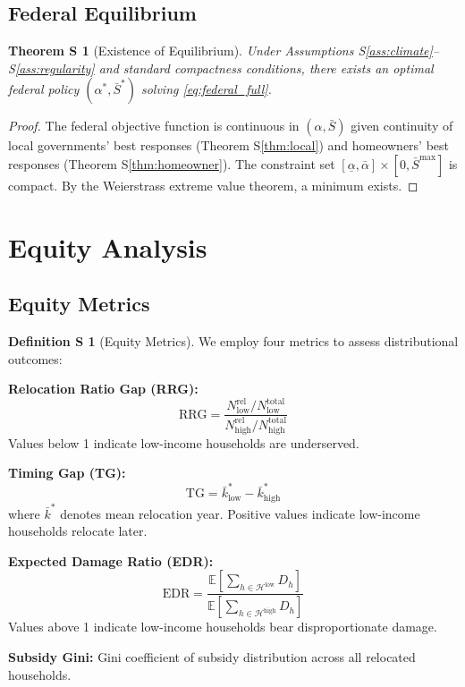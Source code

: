 \documentclass[11pt,letterpaper]{article}
\newtheorem{theoremS}{Theorem S}
\theoremstyle{definition}
\newtheorem{definitionS}{Definition S}
\newcommand{\E}{\mathbb{E}}
\begin{document}
\subsection{Federal Equilibrium}

\begin{theoremS}[Existence of Equilibrium]\label{thm:existence}
Under Assumptions S\ref{ass:climate}--S\ref{ass:regularity} and standard compactness conditions, there exists an optimal federal policy $(\alpha^*, \bar{S}^*)$ solving \eqref{eq:federal_full}.
\end{theoremS}

\begin{proof}
The federal objective function is continuous in $(\alpha, \bar{S})$ given continuity of local governments' best responses (Theorem S\ref{thm:local}) and homeowners' best responses (Theorem S\ref{thm:homeowner}). The constraint set $[\underline{\alpha}, \bar{\alpha}] \times [0, \bar{S}^{\max}]$ is compact. By the Weierstrass extreme value theorem, a minimum exists.
\end{proof}

\section{Equity Analysis}

\subsection{Equity Metrics}

\begin{definitionS}[Equity Metrics]
We employ four metrics to assess distributional outcomes:

\textbf{Relocation Ratio Gap (RRG):}
\begin{equation}
\text{RRG} = \frac{N_{\text{low}}^{\text{rel}} / N_{\text{low}}^{\text{total}}}{N_{\text{high}}^{\text{rel}} / N_{\text{high}}^{\text{total}}}
\end{equation}
Values below 1 indicate low-income households are underserved.

\textbf{Timing Gap (TG):}
\begin{equation}
\text{TG} = \bar{k}_{\text{low}}^* - \bar{k}_{\text{high}}^*
\end{equation}
where $\bar{k}^*$ denotes mean relocation year. Positive values indicate low-income households relocate later.

\textbf{Expected Damage Ratio (EDR):}
\begin{equation}
\text{EDR} = \frac{\E[\sum_{h \in \mathcal{H}^{\text{low}}} D_h]}{\E[\sum_{h \in \mathcal{H}^{\text{high}}} D_h]}
\end{equation}
Values above 1 indicate low-income households bear disproportionate damage.

\textbf{Subsidy Gini:} Gini coefficient of subsidy distribution across all relocated households.
\end{definitionS}
\end{document}
